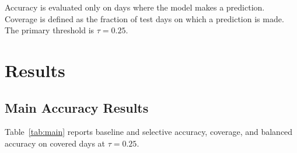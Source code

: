 \documentclass[12pt]{article}
\begin{document}
Accuracy is evaluated only on days where the model makes a prediction. Coverage is defined as
the fraction of test days on which a prediction is made. The primary threshold is $\tau = 0.25$.

\section{Results}
\label{sec:results}

\subsection{Main Accuracy Results}
\label{sec:main}

Table~\ref{tab:main} reports baseline and selective accuracy, coverage, and balanced accuracy
on covered days at $\tau = 0.25$.

\begin{table}[H]
\centering
\caption{Baseline and selective ($\tau = 0.25$) accuracy, coverage, and balanced accuracy on
covered days. Gain = selective minus baseline in percentage points (pp).}
\label{tab:main}
\end{table}
\end{document}
